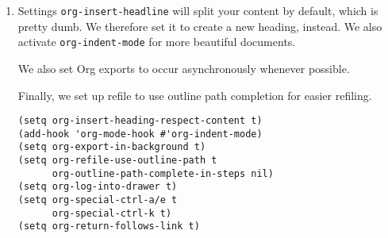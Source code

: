 \documentclass[11pt]{article}
\begin{document}
\begin{enumerate}
\begin{enumerate}
\begin{verbatim}
("S-<left>" . nil)
("S-<right>" . nil)
("S-<up>" . nil)
("S-<down>" . nil)
("C-<left>" . org-shiftleft)
("C-<right>" . org-shiftright)
("C-<up>" . org-shiftup)
("C-<down>" . org-shiftdown)
\end{verbatim}

By default, Org maps \texttt{org-(backward/forward)-paragraph}, but only maps
it to the keys we overrode for shift up and down. We'll remap all
instances so that our existing bindings for those functions will work
as expected.

\begin{verbatim}
([remap backward-paragraph] . org-backward-paragraph)
([remap forward-paragraph] . org-forward-paragraph)
\end{verbatim}

Finally, we'll set up a convenient binding for inserting headings.

\begin{verbatim}
("M-RET" . org-insert-heading)
\end{verbatim}

\item Settings
\label{sec:orga13aefb}
\texttt{org-insert-headline} will split your content by default, which is
pretty dumb. We therefore set it to create a new heading, instead. We
also activate \texttt{org-indent-mode} for more beautiful documents.

We also set Org exports to occur asynchronously whenever possible.

Finally, we set up refile to use outline path completion for easier
refiling.

\begin{verbatim}
(setq org-insert-heading-respect-content t)
(add-hook 'org-mode-hook #'org-indent-mode)
(setq org-export-in-background t)
(setq org-refile-use-outline-path t
      org-outline-path-complete-in-steps nil)
(setq org-log-into-drawer t)
(setq org-special-ctrl-a/e t
      org-special-ctrl-k t)
(setq org-return-follows-link t)
\end{verbatim}


\end{enumerate}
\end{enumerate}
\end{document}
